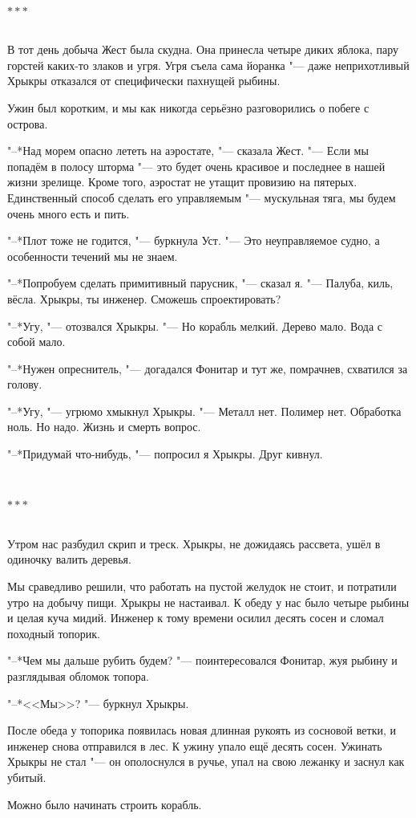 \documentclass[a4paper,12pt,fleqn]{book}
\newcommand{\razd}{~\\{\centering\Large\bfseries$\ast \ast \ast$\par}~\\}
\begin{document}
\razd

В тот день добыча Жест была скудна.
Она принесла четыре диких яблока, пару горстей каких-то злаков и угря.
Угря съела сама йоранка "--- даже неприхотливый Хрыкры отказался от специфически пахнущей рыбины.

Ужин был коротким, и мы как никогда серьёзно разговорились о побеге с острова. 

"--*Над морем опасно лететь на аэростате, "--- сказала Жест.
"--- Если мы попадём в полосу шторма "--- это будет очень красивое и последнее в нашей жизни зрелище.
Кроме того, аэростат не утащит провизию на пятерых.
Единственный способ сделать его управляемым "--- мускульная тяга, мы будем очень много есть и пить.

"--*Плот тоже не годится, "--- буркнула Уст.
"--- Это неуправляемое судно, а особенности течений мы не знаем.

"--*Попробуем сделать примитивный парусник, "--- сказал я.
"--- Палуба, киль, вёсла.
Хрыкры, ты инженер.
Сможешь спроектировать?

"--*Угу, "--- отозвался Хрыкры.
"--- Но корабль мелкий.
Дерево мало.
Вода с собой мало.

"--*Нужен опреснитель, "--- догадался Фонитар и тут же, помрачнев, схватился за голову.

"--*Угу, "--- угрюмо хмыкнул Хрыкры.
"--- Металл нет.
Полимер нет.
Обработка ноль.
Но надо.
Жизнь и смерть вопрос.

"--*Придумай что-нибудь, "--- попросил я Хрыкры.
Друг кивнул.

\razd

Утром нас разбудил скрип и треск.
Хрыкры, не дожидаясь рассвета, ушёл в одиночку валить деревья.

Мы сраведливо решили, что работать на пустой желудок не стоит, и потратили утро на добычу пищи.
Хрыкры не настаивал.
К обеду у нас было четыре рыбины и целая куча мидий.
Инженер к тому времени осилил десять сосен и сломал походный топорик.

"--*Чем мы дальше рубить будем? "--- поинтересовался Фонитар, жуя рыбину и разглядывая обломок топора.

"--*<<Мы>>? "--- буркнул Хрыкры.

После обеда у топорика появилась новая длинная рукоять из сосновой ветки, и инженер снова отправился в лес.
К ужину упало ещё десять сосен.
Ужинать Хрыкры не стал "--- он ополоснулся в ручье, упал на свою лежанку и заснул как убитый.

Можно было начинать строить корабль.
\end{document}
